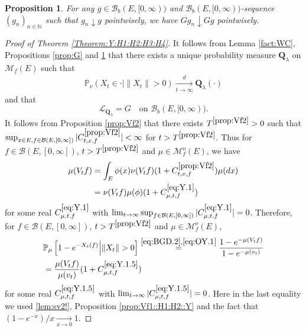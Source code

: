 \documentclass[12pt,a4paper]{amsart}
\numberwithin{equation}{section}
\theoremstyle{plain}
\newtheorem{prop}[thm]{Proposition}
\theoremstyle{definition}
\theoremstyle{remark}
\begin{document}
\begin{prop} \label{prop::GD:H1:H2:H3:H4::Y}
	For any $g\in \mathcal B_b(E,[0,\infty))$ and $\mathcal B_b(E,[0,\infty))$-sequence $(g_n)_{n\in \mathbb N}$ such that $g_n \downarrow g$ pointwisely, 
	we have $G g_n \downarrow Gg$ pointwisely. 
\end{prop}

\begin{proof}[Proof of Theorem \ref{Theorem:Y:H1:H2:H3:H4}]
	It follows from Lemma \ref{fact:WC}, Propositions \ref{prop:G} and \ref{prop::GD:H1:H2:H3:H4::Y} that there exists a unique probability measure $\mathbf Q_\lambda$ on $\mathcal M_f(E)$ such that
\begin{align}\label{eq:Y.0}
 	\mathbb P_{\nu}(X_t \in \cdot | \|X_t\|>0 )
 	\xrightarrow[t\to \infty]{d} \mathbf Q_\lambda(\cdot)
\end{align}
	and that 
\begin{equation} \label{eq:Y.00}
	\mathscr L_{\mathbf Q_\lambda} = G \quad \mbox{on } \mathcal B_b(E,[0,\infty)).
\end{equation}
	It follows from Proposition \ref{prop:Vf2} that there exists $T^{\ref{prop:Vf2}}>0$ such that $\sup_{x\in E, f \in \mathcal B(E,[0,\infty])} |C^{\ref{prop:Vf2}}_{t,x,f}|< \infty$ for $t>T^{\ref{prop:Vf2}}$. 
	Thus for $f \in \mathcal B(E,[0,\infty])$, $t>T^{\ref{prop:Vf2}}$ and $\mu \in \mathcal M_f^o(E)$, we have
\begin{align}
	\mu(V_tf)
	&= \int_E  \phi(x) \nu (V_tf) (1+C^{\ref{prop:Vf2}}_{t,x,f})\mu(dx)
	\\ \label{eq:Y.1} & = \nu(V_tf) \mu(\phi)(1+ C^{\eqref{eq:Y.1}}_{\mu,t,f})
\end{align}
	for some real $C^{\eqref{eq:Y.1}}_{\mu,t,f}$ with 
	$\lim_{t\to \infty} \sup_{f \in \mathcal B(E,[0,\infty])}
	|C^{\eqref{eq:Y.1}}_{\mu,t,f}| = 0$.
	Therefore, for $f\in \mathcal B(E,[0,\infty])$, 
	$t > T^{\ref{prop:Vf2}}$ and $\mu \in \mathcal M_f^o(E)$,
\begin{align}
	&\mathbb P_\mu \left[1 - e^{-X_t(f)} \middle|\|X_t\|>0\right]
	\overset{\eqref{eq:BGD.2},\eqref{eq:OY.1}}= \frac{1 - e^{- \mu(V_tf)}} {1 - e^{-\mu(v_t)}}
	\\\label{eq:Y.1.5}& = \frac{ \mu(V_t f) }{ \mu(v_t) } (1+C^{\eqref{eq:Y.1.5}}_{\mu,t,f})
\end{align}
	for some real $C^{\eqref{eq:Y.1.5}}_{\mu,t,f}$ with $\lim_{t\to \infty} |C^{\eqref{eq:Y.1.5}}_{\mu,t,f}| = 0$. 
	Here in the last equality we used \eqref{lem:sv2!}, Proposition \ref{prop:Vf1::H1:H2::Y} and the fact that $(1-e^{-x})/x \xrightarrow[x\to 0]{}1$.

\end{proof}
\end{document}

